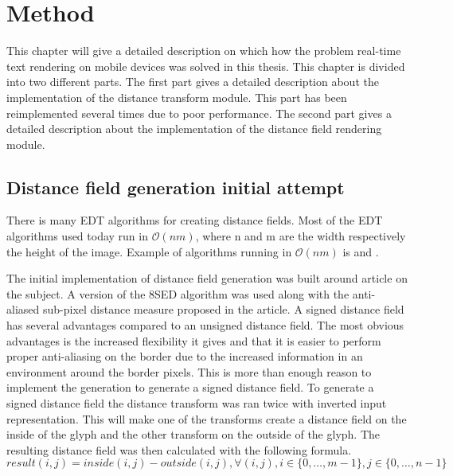 \chapter{Method}\label{cha:method}
This chapter will give a detailed description on which how the problem real-time text rendering on mobile devices was solved in this thesis. This chapter is divided into two different parts. The first part gives a detailed description about the implementation of the distance transform module. This part has been reimplemented several times due to poor performance. The second part gives a detailed description about the implementation of the distance field rendering module.

\section{Distance field generation initial attempt}
There is many EDT algorithms for creating distance fields. Most of the EDT algorithms used today run in $\mathcal{O}(nm)$, where n and m are the width respectively the height of the image. Example of algorithms running in $\mathcal{O}(nm)$ is \citet{Danielsson} and \citet{meijster}.

The initial implementation of distance field generation was built around \citet{Gustavson:2011} article on the subject. A version of the 8SED algorithm was used along with the anti-aliased sub-pixel distance measure proposed in the article. A signed distance field has several advantages compared to an unsigned distance field. The most obvious advantages is the increased flexibility it gives and that it is easier to perform proper anti-aliasing on the border due to the increased information in an environment around the border pixels\citep{gustavson20122d}. This is more than enough reason to implement the generation to generate a signed distance field. To generate a signed distance field the distance transform was ran twice with inverted input representation. This will make one of the transforms create a distance field on the inside of the glyph and the other transform on the outside of the glyph. The resulting distance field was then calculated with the following formula.\vspace{\baselineskip}\newline
$result(i,j) = inside(i,j) - outside(i,j), \forall (i, j), i \in \{0,\dots, m-1\}, j \in \{0,\dots, n-1\}$ \vspace{\baselineskip}\newline
